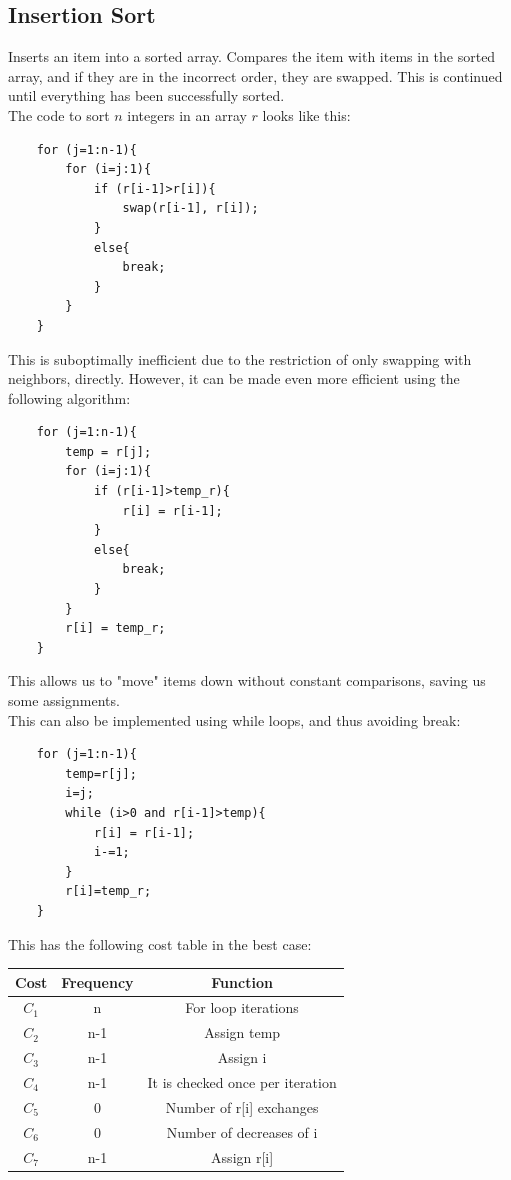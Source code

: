 \documentclass[nobib]{tufte-handout}
\begin{document}
\subsection{Insertion Sort}
Inserts an item into a sorted array. Compares the item with items in the sorted
array, and if they are in the incorrect order, they are swapped. This is
continued until everything has been successfully sorted.\\ The code to sort $n$
integers in an array $r$ looks like this:
\begin{lstlisting}
    for (j=1:n-1){
        for (i=j:1){
            if (r[i-1]>r[i]){
                swap(r[i-1], r[i]);
            }
            else{
                break;
            }
        }
    }
\end{lstlisting}
This is suboptimally inefficient due to the restriction of only swapping with
neighbors, directly. However, it can be made even more efficient using the
following algorithm:
\begin{lstlisting}
    for (j=1:n-1){
        temp = r[j];
        for (i=j:1){
            if (r[i-1]>temp_r){
                r[i] = r[i-1];
            }
            else{
                break;
            }
        }
        r[i] = temp_r;
    }
\end{lstlisting}
This allows us to "move" items down without constant comparisons, saving us
some assignments.\\ This can also be implemented using while loops, and thus
avoiding break:
\begin{lstlisting}
    for (j=1:n-1){
        temp=r[j];
        i=j;
        while (i>0 and r[i-1]>temp){
            r[i] = r[i-1];
            i-=1;
        }
        r[i]=temp_r;
    }
\end{lstlisting}
This has the following cost table in the best case:
\begin{table}
    \centering
    \begin{tabular}{c|c|c}
        Cost  & Frequency & Function                         \\
        \hline
        $C_1$ & n         & For loop iterations              \\
        $C_2$ & n-1       & Assign temp                      \\
        $C_3$ & n-1       & Assign i                         \\
        $C_4$ & n-1       & It is checked once per iteration \\
        $C_5$ & 0         & Number of r[i] exchanges         \\
        $C_6$ & 0         & Number of decreases  of i        \\
        $C_7$ & n-1       & Assign r[i]                      \\
    \end{tabular}
\end{table}
\end{document}
